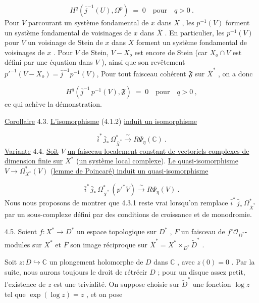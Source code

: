 \begin{equation*}
H^q(\bar{j}^{-1}(U), \Omega^p) \;=\; 0 \quad \text{pour} \quad q > 0 \ .
\end{equation*}
Pour $V$ parcourant un système fondamental de $x$ dans $X$ , les $p^{-1}(V)$ forment un système fondamental de voisinages de $x$ dans $\bar{X}$ . En particulier, les $p^{-1}(V)$ pour $V$ un voisinage de Stein de $x$ dans $X$ forment un système fondamental de voisinages de $x$ . Pour $V$ de Stein, $V-X_o$ est encore de Stein (car $X_o \cap V$ est défini par une équation dans $V$ ), ainsi que son revêtement $p'^{-1}(V-X_o) = \bar{j}^{-1}p^{-1}(V)$,
Pour tout faisceau cohérent $\mathfrak{F}$ sur $\bar{X}^*$ , on a donc

\begin{equation*}
H^q(\bar{j}^{-1} \, p^{-1}(V), \mathfrak{F}) \;=\; 0 \quad \text{pour} \quad q > 0 \ ,
\end{equation*}
ce qui achève la démonstration.

\underline{Corollaire} 4.3.  \underline{L'isomorphisme} (4.1.2) \underline{induit un isomorphisme}

\begin{equation}\tag{4.3.1}
\bar{i}^* \, \bar{j}_* \, \Omega^*_{\bar{X}^*} \xrightarrow{\;\sim\;} R\Psi_\eta(\mathbb{C}) \ .
\end{equation}
\underline{Variante} 4.4.  \underline{Soit} $V$ \underline{un faisceau localement constant de vectoriels complexes de dimension finie sur} $X^*$ (\underline{un système local complexe}). \underline{Le quasi-isomorphisme} $V \longrightarrow \Omega^*_{X^*}(V)$ (\underline{lemme de Poincaré) induit un quasi-isomorphisme}

\begin{equation}\tag{4.4.1}
\bar{i}^* \, \bar{j}_* \, \Omega^*_{\bar{X}^*} \, (p'^* V) \xrightarrow{\;\sim\;} R\Psi_\eta(V) \ .
\end{equation}
Nous nous proposons de montrer que 4.3.1 reste vrai lorsqu'on remplace $\bar{i}^* \, \bar{j}_* \, \Omega^*_{\bar{X}^*}$ par un sous-complexe défini par des conditions de croissance et de monodromie.

4.5.  Soient $f : X^* \to D^*$ un espace topologique sur $D^*$ , $F$ un faisceau de $f^{\circ} \mathcal{O}_{D^*}$-modules sur $X^*$ et $\bar{F}$ son image réciproque sur $\bar{X}^* = X^* \times_{D^*} \tilde{D}^*$ .

Soit $z : D \hookrightarrow \mathbb{C}$ un plongement holomorphe de $D$ dans $\mathbb{C}$ , avec $z(0) = 0$ . Par la suite, nous aurons toujours le droit de rétrécir $D$ ; pour un disque assez petit, l'existence de $z$ est une trivialité. On suppose choisie sur $\tilde{D}^*$ une fonction $\log z$ tel que $\exp(\log z) = z$ , et on pose

